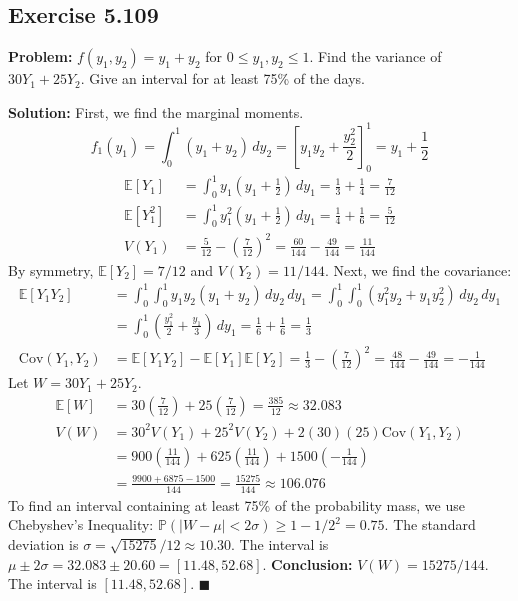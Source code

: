 \documentclass[11pt, a4paper]{article}
\theoremstyle{definition}
\theoremstyle{remark}
\newcommand{\E}{\mathbb{E}}
\newcommand{\Prob}{\mathbb{P}}
\begin{document}
\subsection{Exercise 5.109}
\textbf{Problem:} $f(y_1, y_2) = y_1 + y_2$ for $0 \le y_1, y_2 \le 1$. Find the variance of $30Y_1 + 25Y_2$. Give an interval for at least 75\% of the days.

\textbf{Solution:}
First, we find the marginal moments.
\[ f_1(y_1) = \int_0^1 (y_1 + y_2) \, dy_2 = \left[ y_1 y_2 + \frac{y_2^2}{2} \right]_0^1 = y_1 + \frac{1}{2} \]
\begin{align*}
\E[Y_1] &= \int_0^1 y_1\left(y_1 + \frac{1}{2}\right) \, dy_1 = \frac{1}{3} + \frac{1}{4} = \frac{7}{12} \\
\E[Y_1^2] &= \int_0^1 y_1^2\left(y_1 + \frac{1}{2}\right) \, dy_1 = \frac{1}{4} + \frac{1}{6} = \frac{5}{12} \\
V(Y_1) &= \frac{5}{12} - \left(\frac{7}{12}\right)^2 = \frac{60}{144} - \frac{49}{144} = \frac{11}{144}
\end{align*}
By symmetry, $\E[Y_2] = 7/12$ and $V(Y_2) = 11/144$.
Next, we find the covariance:
\begin{align*}
\E[Y_1 Y_2] &= \int_0^1 \int_0^1 y_1 y_2 (y_1 + y_2) \, dy_2 \, dy_1 = \int_0^1 \int_0^1 (y_1^2 y_2 + y_1 y_2^2) \, dy_2 \, dy_1 \\
&= \int_0^1 \left( \frac{y_1^2}{2} + \frac{y_1}{3} \right) \, dy_1 = \frac{1}{6} + \frac{1}{6} = \frac{1}{3} \\
\text{Cov}(Y_1, Y_2) &= \E[Y_1 Y_2] - \E[Y_1]\E[Y_2] = \frac{1}{3} - \left(\frac{7}{12}\right)^2 = \frac{48}{144} - \frac{49}{144} = -\frac{1}{144}
\end{align*}
Let $W = 30Y_1 + 25Y_2$.
\begin{align*}
\E[W] &= 30\left(\frac{7}{12}\right) + 25\left(\frac{7}{12}\right) = \frac{385}{12} \approx 32.083 \\
V(W) &= 30^2 V(Y_1) + 25^2 V(Y_2) + 2(30)(25)\text{Cov}(Y_1, Y_2) \\
&= 900\left(\frac{11}{144}\right) + 625\left(\frac{11}{144}\right) + 1500\left(-\frac{1}{144}\right) \\
&= \frac{9900 + 6875 - 1500}{144} = \frac{15275}{144} \approx 106.076
\end{align*}
To find an interval containing at least 75\% of the probability mass, we use Chebyshev's Inequality: $\Prob(|W - \mu| < 2\sigma) \ge 1 - 1/2^2 = 0.75$.
The standard deviation is $\sigma = \sqrt{15275}/12 \approx 10.30$.
The interval is $\mu \pm 2\sigma = 32.083 \pm 20.60 = [11.48, 52.68]$.
\textbf{Conclusion:} $V(W) = 15275/144$. The interval is $[11.48, 52.68]$. $\blacksquare$
\end{document}
